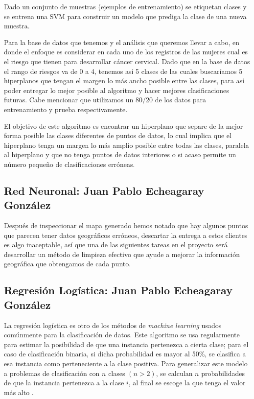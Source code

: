 \documentclass[journal]{IEEEtran}                                                          %
\begin{document}
            Dado un conjunto de muestras (ejemplos de entrenamiento) se etiquetan clases y se entrena una SVM para construir un modelo que prediga la clase de una nueva muestra.

            Para la base de datos que tenemos y el análisis que queremos llevar a cabo, en donde el enfoque es considerar en cada uno de los registros de las mujeres cual es el riesgo que tienen para desarrollar cáncer cervical. Dado que en la base de datos el rango de riesgos va de 0 a 4, tenemos así 5 clases de las cuales buscaríamos 5 hiperplanos que tengan el margen lo más ancho posible entre las clases, para así poder entregar lo mejor posible al algoritmo y hacer mejores clasificaciones futuras. Cabe mencionar que utilizamos un 80/20 de los datos para entrenamiento y prueba respectivamente.

            El objetivo de este algoritmo es encontrar un hiperplano que separe de la mejor forma posible las clases diferentes de puntos de datos, lo cual implica que el hiperplano tenga un margen lo más amplio posible entre todas las clases, paralela al hiperplano y que no tenga puntos de datos interiores o si acaso permite un número pequeño de clasificaciones erróneas.

        \subsection{Red Neuronal: Juan Pablo Echeagaray González} \label{neural-network}
            Después de inspeccionar el mapa generado hemos notado que hay algunos puntos que parecen tener datos geográficos erróneos, descartar la entrega a estos clientes es algo inaceptable, así que una de las siguientes tareas en el proyecto será desarrollar un método de limpieza efectivo que ayude a mejorar la información geográfica que obtengamos de cada punto.

        \subsection{Regresión Logística: Juan Pablo Echeagaray González} \label{logistic}

            La regresión logística es otro de los métodos de \emph{machine learning} usados comúnmente para la clasificación de datos. Este algoritmo se usa regularmente para estimar la posibilidad de que una instancia pertenezca a cierta clase; para el caso de clasificación binaria, si dicha probabilidad es mayor al 50\%, se clasifica a esa instancia como perteneciente a la clase positiva. Para generalizar este modelo a problemas de clasificación con $n$ clases $(n > 2)$, se calculan $n$ probabilidades de que la instancia pertenezca a la clase $i$, al final se escoge la que tenga el valor más alto \cite{geron-2019} \cite{sci-kit-learn-no-dateB}.
\end{document}
